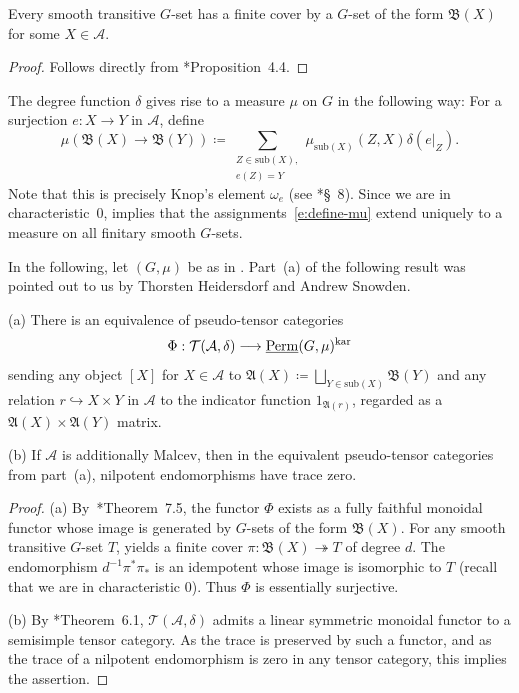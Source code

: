 \documentclass[11pt]{amsart}
\newcommand\Cref[1]{\zcref[S]{#1}}
\theoremstyle{definition}
\theoremstyle{remark}
\newcommand\cA{\mathcal A}
\newcommand\cT{\mathcal T}
\newcommand\fA{\mathfrak A}
\newcommand\fB{\mathfrak B}
\newcommand\uPerm{\underline{\smash{\operatorname{Perm}}}}
\renewcommand\:\colon
\renewcommand\:\colon
\newcommand\kar{^{\mathrm{kar}}}
\newcommand\subobj{\mathrm{sub}}
\newcommand\tto{\twoheadrightarrow}
\begin{document}
\begin{proposition} \label{p:bx-finite-cover}
    Every smooth transitive $G$-set has a finite cover by a $G$-set of the form $\fB(X)$ for some $X \in \cA$.
\end{proposition}
\begin{proof}
    Follows directly from \cite{knoptooligo}*{Proposition~4.4}.
\end{proof}

\begin{construction} \label{c:mu}
    The degree function $\delta$ gives rise to a measure $\mu$ on $G$ in the following way: For a surjection $e: X \to Y$ in $\cA$, define
    \begin{equation} \label{e:define-mu}
        \mu(\fB(X) \to \fB(Y)) \coloneqq \sum_{\substack{Z \in \subobj(X),\\e(Z)=Y}} \mu_{\subobj(X)}(Z, X) \delta(e|_Z).
    \end{equation}
    Note that this is precisely Knop's element $\omega_e$ (see \cite{knop}*{\S~8}). Since we are in characteristic~0, \Cref{p:bx-finite-cover} implies that the assignments~\eqref{e:define-mu} extend uniquely to a measure on all finitary smooth $G$-sets.
\end{construction}

In the following, let $(G, \mu)$ be as in \Cref{c:g,c:mu}. Part~(a) of the following result was pointed out to us by Thorsten Heidersdorf and Andrew Snowden.

\begin{proposition} \label{p:knoptooligo}
    (a) There is an equivalence of pseudo-tensor categories
    \[
        \Phi: \cT(\cA, \delta) \longrightarrow \uPerm(G, \mu)\kar
    \]
    sending any object $[X]$ for $X \in \cA$ to $\fA(X) \coloneqq \bigsqcup_{Y \in \subobj(X)} \fB(Y)$ and any relation $r \hookrightarrow X \times Y$ in $\cA$ to the indicator function $1_{\fA(r)}$, regarded as a $\fA(X) \times \fA(Y)$ matrix.

    (b) If $\cA$ is additionally Malcev, then in the equivalent pseudo-tensor categories from part~(a), nilpotent endomorphisms have trace zero.
\end{proposition}
\begin{proof}
    (a) By~\cite{knoptooligo}*{Theorem~7.5}, the functor $\Phi$ exists as a fully faithful monoidal functor whose image is generated by $G$-sets of the form $\fB(X)$. For any smooth transitive $G$-set $T$, \Cref{p:bx-finite-cover} yields a finite cover $\pi: \fB(X) \tto T$ of degree $d$. The endomorphism $d^{-1}\pi^*\pi_*$ is an idempotent whose image is isomorphic to $T$ (recall that we are in characteristic 0). Thus $\Phi$ is essentially surjective.

    (b) By \cite{knop}*{Theorem~6.1}, $\cT(\cA,\delta)$ admits a linear symmetric monoidal functor to a semisimple tensor category. As the trace is preserved by such a functor, and as the trace of a nilpotent endomorphism is zero in any tensor category, this implies the assertion.
\end{proof}
\end{document}

